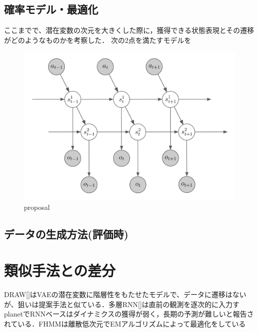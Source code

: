 \subsection{確率モデル・最適化}

ここまでで、潜在変数の次元を大きくした際に，獲得できる状態表現とその遷移がどのようなものかを考察した．
次の2点を満たすモデルを


\begin{figure}[tbp]
  \begin{center}
    \includegraphics[width=\linewidth]{./figures/proposal.png}
    \caption{proposal}
    \label{fig:proposal}
  \end{center}
\end{figure}

\subsection{データの生成方法(評価時)}
\section{類似手法との差分}
DRAW[]はVAEの潜在変数に階層性をもたせたモデルで、データに遷移はないが、狙いは提案手法と似ている．多層RNN[]は直前の観測を逐次的に入力すplanetでRNNベースはダイナミクスの獲得が弱く，長期の予測が難しいと報告されている．FHMMは離散低次元でEMアルゴリズムによって最適化をしている


